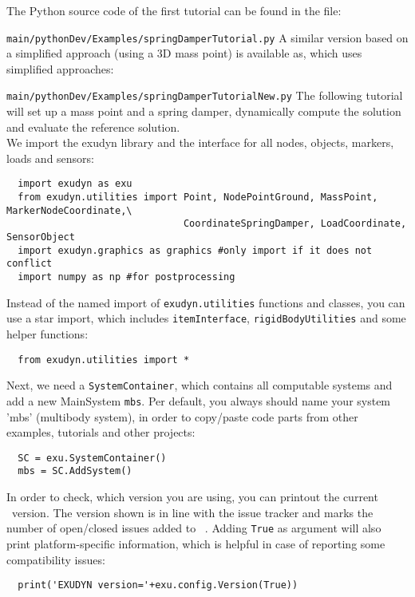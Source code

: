 The Python source code of the first tutorial can be found in the file:
\bi
  \item[] \texttt{main/pythonDev/Examples/springDamperTutorial.py}
\ei
A similar version based on a simplified approach (using a 3D mass point) is available as, which uses simplified approaches:
\bi
  \item[] \texttt{main/pythonDev/Examples/springDamperTutorialNew.py}
\ei
The following tutorial will set up a mass point and a spring damper, dynamically compute the solution and evaluate the reference solution.
\vspace{6pt}\\
We import the exudyn library and the interface for all nodes, objects, markers, loads and sensors:
\pythonstyle\begin{lstlisting}
  import exudyn as exu
  from exudyn.utilities import Point, NodePointGround, MassPoint, MarkerNodeCoordinate,\
                               CoordinateSpringDamper, LoadCoordinate, SensorObject
  import exudyn.graphics as graphics #only import if it does not conflict
  import numpy as np #for postprocessing
\end{lstlisting}
%
Instead of the named import of \texttt{exudyn.utilities} functions and classes, you can use a star import,
which includes \texttt{itemInterface}, \texttt{rigidBodyUtilities} and some helper functions:
\pythonstyle\begin{lstlisting}
  from exudyn.utilities import *
\end{lstlisting}
%
Next, we need a \texttt{SystemContainer}, which contains all computable systems and add a new MainSystem \texttt{mbs}.
Per default, you always should name your system 'mbs' (multibody system), in order to copy/paste code parts from other examples, tutorials and other projects:
\pythonstyle\begin{lstlisting}
  SC = exu.SystemContainer()
  mbs = SC.AddSystem()
\end{lstlisting}
%
In order to check, which version you are using, you can printout the current \codeName\ version. 
The version shown is in line with the issue tracker and marks the number of open/closed issues added to \codeName\ .
Adding \texttt{True} as argument will also print platform-specific information, which is helpful 
in case of reporting some compatibility issues:
\pythonstyle\begin{lstlisting}
  print('EXUDYN version='+exu.config.Version(True))
\end{lstlisting}
